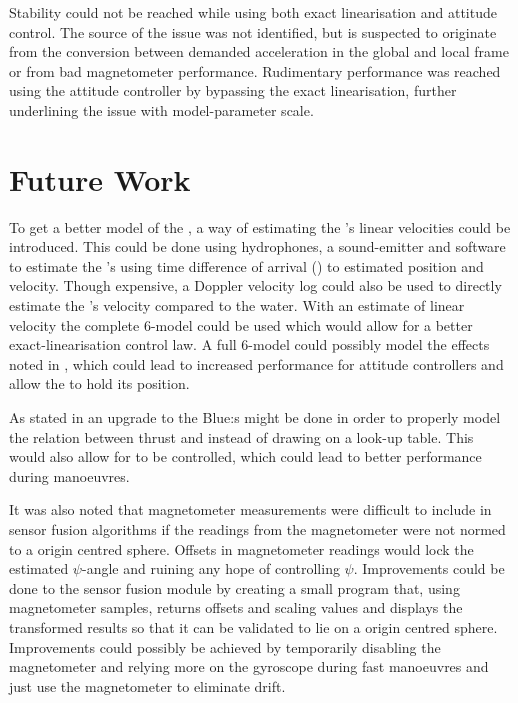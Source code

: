 Stability could not be reached while using both exact linearisation and attitude control. The source of the issue was not identified, but is suspected to originate from the conversion between demanded acceleration in the global and local frame or from bad magnetometer performance. Rudimentary performance was reached using the attitude controller by bypassing the exact linearisation, further underlining the issue with model-parameter scale.
\section{Future Work}
To get a better model of the \abbrROV, a way of estimating the \abbrROV's linear velocities could be introduced. This could be done using hydrophones, a sound-emitter and software to estimate the \abbrROV's using time difference of arrival (\abbrTDOA) to estimated position and velocity. Though expensive, a Doppler velocity log could also be used to directly estimate the \abbrROV's velocity compared to the water.
With an estimate of linear velocity the complete 6-\abbrDOF model could be used which would allow for a better exact-linearisation control law. A full 6-\abbrDOF model could possibly model the effects noted in , which could lead to increased performance for attitude controllers and allow the \abbrROV to hold its position.

As stated in  an upgrade to the Blue\abbrESC:s might be done in order to properly model the relation between thrust and \abbrRPM instead of drawing on a look-up table. This would also allow for \abbrRPM to be controlled, which could lead to better performance during manoeuvres. 

It was also noted that magnetometer measurements were difficult to include in sensor fusion algorithms if the readings from the magnetometer were not normed to a origin centred sphere. Offsets in magnetometer readings would lock the estimated $\psi$-angle and ruining any hope of controlling $\psi$. Improvements could be done to the sensor fusion module by creating a small program that, using magnetometer samples, returns offsets and scaling values and displays the transformed results so that it can be validated to lie on a origin centred sphere.
Improvements could possibly be achieved by temporarily disabling the magnetometer and relying more on the gyroscope during fast manoeuvres and just use the magnetometer to eliminate drift. 